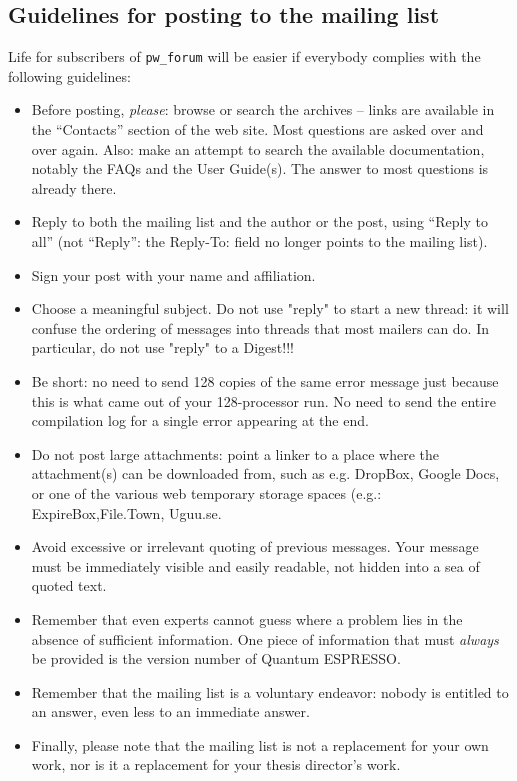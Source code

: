 \documentclass[12pt,a4paper]{article}
\def\qe{{\sc Quantum ESPRESSO}}
\begin{document}
\subsection{Guidelines for posting to the mailing list}
\label{SubSec:Guidelines}
Life for subscribers of \texttt{pw\_forum} will be easier if everybody
complies with the following guidelines:
\begin{itemize}
\item Before posting, {\em please}: browse or search the archives --
  links are available in the ``Contacts'' section  of the   web site.
  Most questions are asked over and over again. Also: make an attempt
  to search the
  available documentation, notably the FAQs and the User Guide(s).
  The answer to most questions is already there.
\item Reply to both the mailing list and the author or the post, using
  ``Reply to all'' (not ``Reply'': the Reply-To: field no longer points
   to the mailing list).
\item Sign your post with your name and affiliation.
\item Choose a meaningful subject. Do not use "reply" to start a new
  thread:
  it will confuse the ordering of messages into threads that most mailers
  can do. In particular, do not use "reply" to a Digest!!!
\item Be short: no need to send 128 copies of the same error message just
  because this is what came out of your 128-processor run. No need to
  send the entire compilation log for a single error appearing at the end.
\item Do not post large attachments: point a linker to a place where the
  attachment(s) can be downloaded from, such as e.g. DropBox, Google Docs, 
  or one of the various web temporary storage spaces (e.g.: 
  ExpireBox,File.Town, Uguu.se.
\item Avoid excessive or irrelevant quoting of previous messages. Your
  message must be immediately visible and easily readable, not hidden
  into a sea of quoted text.
\item Remember that even experts cannot guess where a problem lies in
  the absence of sufficient information. One piece of information that
  must {\em always} be provided is the version number of \qe.
\item Remember that the mailing list is a voluntary endeavor: nobody is
  entitled to an answer, even less to an immediate answer.
\item Finally, please note that the mailing list is not a replacement
  for your own work, nor is it a replacement for your thesis director's
  work.
\end{itemize}
\end{document}
